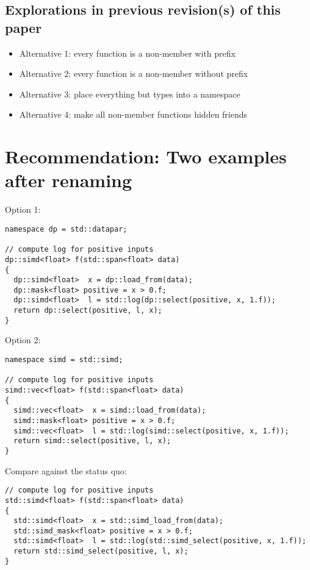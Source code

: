 \subsection{Explorations in previous revision(s) of this paper}
\begin{itemize}
  \item Alternative 1: every function is a non-member with  prefix
  \item Alternative 2: every function is a non-member without  prefix
  \item Alternative 3: place everything but types into a namespace
  \item Alternative 4: make all non-member functions hidden friends
\end{itemize}


\pagebreak
\pagebreak
\pagebreak



\pagebreak
\section{Recommendation: Two examples after renaming}

Option 1:
\medskip\begin{lstlisting}
namespace dp = std::datapar;

// compute log for positive inputs
dp::simd<float> f(std::span<float> data)
{
  dp::simd<float>  x = dp::load_from(data);
  dp::mask<float> positive = x > 0.f;
  dp::simd<float>  l = std::log(dp::select(positive, x, 1.f));
  return dp::select(positive, l, x);
}
\end{lstlisting}

Option 2:
\medskip\begin{lstlisting}
namespace simd = std::simd;

// compute log for positive inputs
simd::vec<float> f(std::span<float> data)
{
  simd::vec<float>  x = simd::load_from(data);
  simd::mask<float> positive = x > 0.f;
  simd::vec<float>  l = std::log(simd::select(positive, x, 1.f));
  return simd::select(positive, l, x);
}
\end{lstlisting}

Compare against the status quo:
\medskip\begin{lstlisting}
// compute log for positive inputs
std::simd<float> f(std::span<float> data)
{
  std::simd<float>  x = std::simd_load_from(data);
  std::simd_mask<float> positive = x > 0.f;
  std::simd<float>  l = std::log(std::simd_select(positive, x, 1.f));
  return std::simd_select(positive, l, x);
}
\end{lstlisting}


